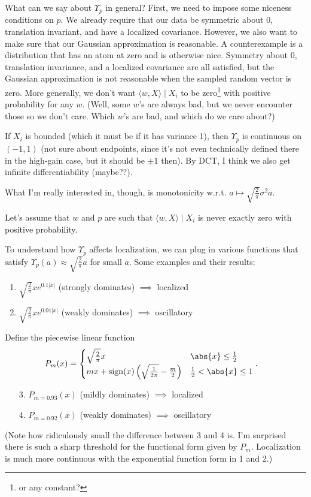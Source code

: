 \documentclass[usletter,twoside,12pt]{book}
\begin{document}
What can we say about $\Upsilon_p$ in general?
First, we need to impose some niceness conditions on $p$.
We already require that our data be symmetric about 0, translation invariant, and have a localized covariance.
However, we also want to make sure that our Gaussian approximation is reasonable.
A counterexample is a distribution that has an atom at zero and is otherwise nice.
Symmetry about 0, translation invariance, and a localized covariance are all satisfied, but the Gaussian approximation is not reasonable when the sampled random vector is zero.
More generally, we don't want $\langle w, X \rangle \mid X_i$ to be zero\footnote{or any constant?} with positive probability for any $w$.
(Well, some $w$'s are always bad, but we never encounter those so we don't care.
Which $w$'s are bad, and which do we care about?)

If $X_i$ is bounded (which it must be if it has variance 1), then $\Upsilon_p$ is continuous on $(-1,1)$ (not sure about endpoints, since it's not even technically defined there in the high-gain case, but it should be $\pm 1$ then).
By DCT, I think we also get infinite differentiability (maybe??).

What I'm really interested in, though, is monotonicity w.r.t. $a \mapsto \sqrt{\frac{2}{\pi}} \sigma^2 a$.

Let's assume that $w$ and $p$ are such that $\langle w, X \rangle \mid X_i$ is never exactly zero with positive probability.


To understand how $\Upsilon_p$ affects localization, we can plug in various functions that satisfy $\Upsilon_p(a) \approx \sqrt{\frac{2}{\pi}} a$ for small $a$.
Some examples and their results:
\begin{enumerate}
   \item $\sqrt{\frac{2}{\pi}} x e^{0.1 |x|}$ (strongly dominates) $\implies$ localized
   \item $\sqrt{\frac{2}{\pi}} x e^{0.01 |x|}$ (weakly dominates) $\implies$ oscillatory
\end{enumerate}
Define the piecewise linear function
\begin{align}
   P_m(x) &= 
   \begin{cases} 
      \sqrt{\frac{2}{\pi}} x & \abs{x} \leq \frac{1}{2} \\ 
      m x + \operatorname{sign}(x) \left( \sqrt{\frac{1}{2\pi}}-\frac{m}{2} \right) & \frac{1}{2} < \abs{x} \leq 1
   \end{cases}.
\end{align}
\begin{enumerate}
   \item[3.] $P_{m=0.93}(x)$ (mildly dominates) $\implies$ localized
   \item[4.] $P_{m=0.92}(x)$ (weakly dominates) $\implies$ oscillatory
\end{enumerate}
(Note how ridiculously small the difference between 3 and 4 is.
I'm surprised there is such a sharp threshold for the functional form given by $P_m$.
Localization is much more continuous with the exponential function form in 1 and 2.)
\end{document}
